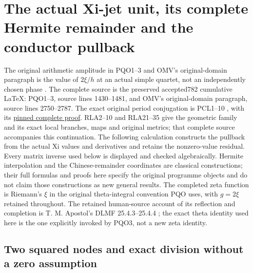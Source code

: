 \section{The actual Xi-jet unit, its complete Hermite remainder and the conductor pullback}
\label{sec:actual-unit-hermite}

The original arithmetic amplitude in PQO1--3 and OMV's original-domain
paragraph is the value of $2\xi/h$ at an actual simple quartet,
not an independently chosen phase \cite{Cumulative}.
The complete source is the preserved accepted782 cumulative LaTeX:
PQO1--3, source lines 1430--1481, and OMV's original-domain paragraph,
source lines 2750--2787.
The exact original period conjugation is PCL1--10
\cite{PCLOriginal}, with its
\href{https://github.com/KokunoYumeto/zeta-function-research-reader/blob/487253b5b01851da5b9b98af4e146fecf1fab902/workbenches/splitzero-tandem/continuations/20260919-native-conductor-coprimality/providers/PCL_COMPLETE.tex#L19}{pinned complete proof}.
RLA2--10 and RLA21--35 \cite{RLA008} give the geometric family and
its exact local branches, maps and original metrics; that complete
source accompanies this continuation.
The following calculation constructs the pullback from the actual
Xi values and derivatives and retains the nonzero-value residual.
Every matrix inverse used below is displayed and checked algebraically.
Hermite interpolation and the Chinese-remainder coordinates are
classical constructions; their full formulas and proofs here specify
the original programme objects and do not claim those constructions
as new general results.  The completed zeta function is Riemann's
$\xi$ in the original theta-integral convention PQO uses, with
$g=2\xi$ retained throughout.  The retained human-source account
of its reflection and completion is T. M. Apostol's DLMF
25.4.3--25.4.4 \cite{DLMFXi}; the exact theta identity used here
is the one explicitly invoked by PQO3, not a new zeta identity.

\subsection{Two squared nodes and exact division without a zero assumption}

